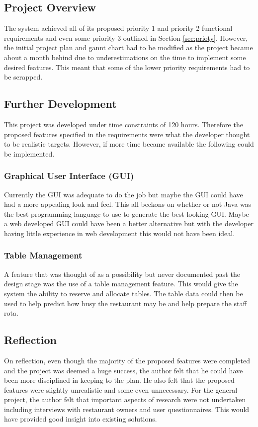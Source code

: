 \documentclass[12pt,a4paper]{article}
\begin{document}
	\subsection{Project Overview}
	The system achieved all of its proposed priority 1 and priority 2 functional requirements and even some
priority 3 outlined in Section \ref{sec:prioty}.
However, the initial project plan and gannt chart had to be modified as the project became about
a month behind due to underestimations on the time to implement some desired features. This meant
that some of the lower priority requirements had to be scrapped.
	\subsection{Further Development}
	This project was developed under time constraints of 120 hours. Therefore the proposed features
specified in the requirements were what the developer thought to be realistic targets.
However, if more time became available the following could be implemented.
	\subsubsection{Graphical User Interface (GUI)}
	Currently the GUI was adequate to do the job but maybe the GUI could have had a more appealing
look and feel. This all beckons on whether or not Java was the best programming language to use to
generate the best looking GUI. Maybe a web developed GUI could have been a better alternative but
with the developer having little experience in web development this would not have been ideal.
	\subsubsection{Table Management}
	A feature that was thought of as a possibility but never documented past the design stage was the use
of a table management feature. This would give the system the ability to reserve and allocate tables.
The table data could then be used to help predict how busy the restaurant may be and help prepare
the staff rota.
	\subsection{Reflection}
	On reflection, even though the majority of the proposed features were completed and the project was
deemed a huge success, the author felt that he could have been more disciplined in keeping to the plan.
He also felt that the proposed features were slightly unrealistic and some even unnecessary.
For the general project, the author felt that important aspects of research were not undertaken
including interviews with restaurant owners and user questionnaires. This would have provided good
insight into existing solutions.
\end{document}
